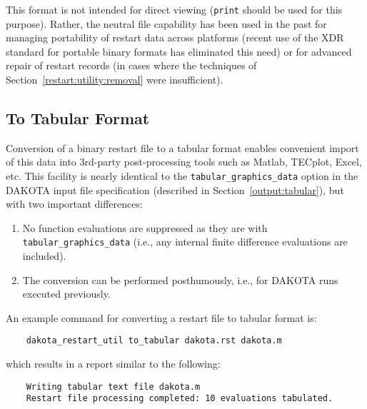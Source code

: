 This format is not intended for direct viewing (\texttt{print} should
be used for this purpose). Rather, the neutral file capability has
been used in the past for managing portability of restart data across
platforms (recent use of the XDR standard for portable binary formats
has eliminated this need) or for advanced repair of restart records
(in cases where the techniques of Section~\ref{restart:utility:removal} 
were insufficient).

\subsection{To Tabular Format}\label{restart:utility:tabular}

Conversion of a binary restart file to a tabular format enables
convenient import of this data into 3rd-party post-processing tools
such as Matlab, TECplot, Excel, etc. This facility is nearly identical
to the \texttt{tabular\_graphics\_data} option in the DAKOTA input
file specification (described in Section~\ref{output:tabular}), but
with two important differences:
\begin{enumerate}
\item No function evaluations are suppressed as they are with
  \texttt{tabular\_graphics\_data} (i.e., any internal finite
  difference evaluations are included).
\item The conversion can be performed posthumously, i.e., for DAKOTA
  runs executed previously.
\end{enumerate}

An example command for converting a restart file to tabular format is:
\begin{verbatim}
    dakota_restart_util to_tabular dakota.rst dakota.m
\end{verbatim}
which results in a report similar to the following:
\begin{verbatim}
    Writing tabular text file dakota.m
    Restart file processing completed: 10 evaluations tabulated.
\end{verbatim}

